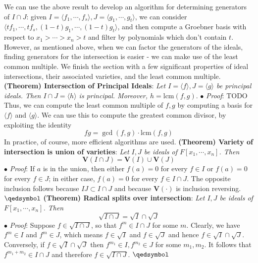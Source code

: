 \documentclass{article}
\newcommand*{\tb}{\textbf}
\newcommand*{\ti}{\textit}
\newcommand*{\n}{\newline}
\newcommand*{\nn}{\newline \newline}
\newcommand*{\Fx}{\ensuremath{F[x_1, \cdots, x_n]}}
\newcommand*{\gt}{g_1, \cdots, g_t}
\newcommand*{\lfsr}{\langle f_1, \cdots, f_s \rangle}
\newcommand*{\V}{\ensuremath{\mathbf{V}}}
\begin{document}
\nn
We can use the above result to develop an algorithm for determining generators of $ I \cap J $: given $ I = \lfsr, J = \langle \gt \rangle $, we can consider $ \langle t f_1, \cdots, t f_s, (1 - t) g_1, \cdots, (1 - t) g_t \rangle $, and then compute a Groebner basis with respect to $ x_1 > \cdots > x_n > t $ and filter by polynomials which don't contain $ t $. However, as mentioned above, when we can factor the generators of the ideals, finding generators for the intersection is easier - we can make use of the least common multiple. We finish the section with a few significant properties of ideal intersections, their associated varieties, and the least common multiple.
\nn
\tb{(Theorem) Intersection of Principal Ideals}: \ti{Let $ I = \langle f \rangle, J = \langle g \rangle $ be principal ideals. Then $ I \cap J = \langle h \rangle $ is principal. Moreover, $ h = \text{lcm}(f, g). $}
\n
\indent $ \bullet $ \ti{Proof}: TODO
\nn
Thus, we can compute the least common multiple of $ f, g $ by computing a basis for $ \langle f \rangle $ and $ \langle g \rangle $. We can use this to compute the greatest common divisor, by exploiting the identity
$$ f g = \gcd(f, g) \cdot \text{lcm}(f, g) $$
In practice, of course, more efficient algorithms are used.
\nn
\tb{(Theorem) Variety of intersection is union of varieties}: \ti{Let $ I, J $ be ideals of $ \Fx $. Then}
$$ \V(I \cap J) = \V(I) \cup \V(J) $$
\indent $ \bullet $ \ti{Proof}: If $ a $ is in the union, then either $ f(a) = 0 $ for every $ f \in I $ or $ f(a) = 0 $ for every $ f \in J $; in either case, $ f(a) = 0 $ for every $ f \in I \cap J $. The opposite inclusion follows because $ I J \subset I \cap J $ and because $ \V(\cdot) $ is inclusion reversing. $ \qedsymbol $
\nn
\tb{(Theorem) Radical splits over intersection}: \ti{Let $ I, J $ be ideals of $ \Fx $. Then}
$$ \sqrt{I \cap J} = \sqrt{I} \cap \sqrt{J} $$
\indent $ \bullet $ \ti{Proof}: Suppose $ f \in \sqrt{I \cap J} $, so that $ f^m \in I \cap J $ for some $ m $. Clearly, we have $ f^m \in I $ and $ f^m \in J $, which means $ f \in \sqrt{I} $ and $ f \in \sqrt{J} $ and hence $ f \in \sqrt{I} \cap \sqrt{J} $. Conversely, if $ f \in \sqrt{I} \cap \sqrt{J} $ then $ f^{m_1} \in I, f^{m_2} \in J $ for some $ m_1, m_2 $. It follows that $ f^{m_1 + m_2} \in I \cap J $ and therefore $ f \in \sqrt{I \cap J} $. $ \qedsymbol $
\end{document}
